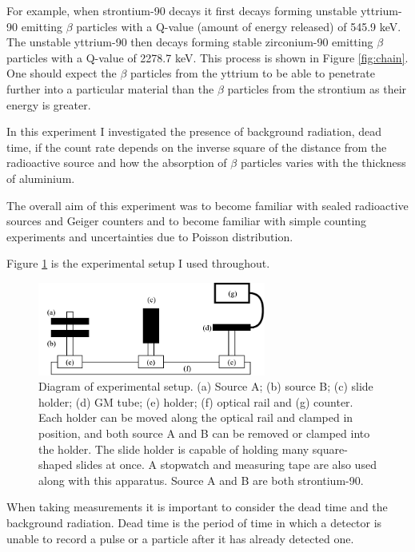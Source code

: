 \documentclass[twocolumn]{revtex4-1}
\begin{document}
For example, when strontium-90 decays it first decays forming unstable yttrium-90 emitting $\beta$ particles with a Q-value (amount of energy released) of 545.9 keV\cite{Qval}. 
The unstable yttrium-90 then decays forming stable zirconium-90 emitting $\beta$ particles with a Q-value of 2278.7 keV\cite{Qval}.
This process is shown in Figure \ref{fig:chain}.
One should expect the $\beta$ particles from the yttrium to be able to penetrate further into a particular material than the $\beta$ particles from the strontium as their energy is greater.

In this experiment I investigated the presence of background radiation, dead time, if the count rate depends on the inverse square of the distance from the radioactive source and how the absorption of $\beta$ particles varies with the thickness of aluminium.

The overall aim of this experiment was to become familiar with sealed radioactive sources and Geiger counters and to become familiar with simple counting experiments and uncertainties due to Poisson distribution.

Figure \ref{fig:rail} is the experimental setup I used throughout.

\begin{figure}[!h]
\begin{center}
\includegraphics[width=7.5cm]{rail}
\caption{Diagram of experimental setup. (a) Source A; (b) source B; (c) slide holder; (d) GM tube; (e) holder; (f) optical rail and (g) counter. Each holder can be moved along the optical rail and clamped in position, and both source A and B can be removed or clamped into the holder. The slide holder is capable of holding many square-shaped slides at once. A stopwatch and measuring tape are also used along with this apparatus. Source A and B are both strontium-90.}
\label{fig:rail}
\end{center}
\end{figure}

When taking measurements it is important to consider the dead time and the background radiation.
Dead time is the period of time in which a detector is unable to record a pulse or a particle after it has already detected one.
\end{document}
